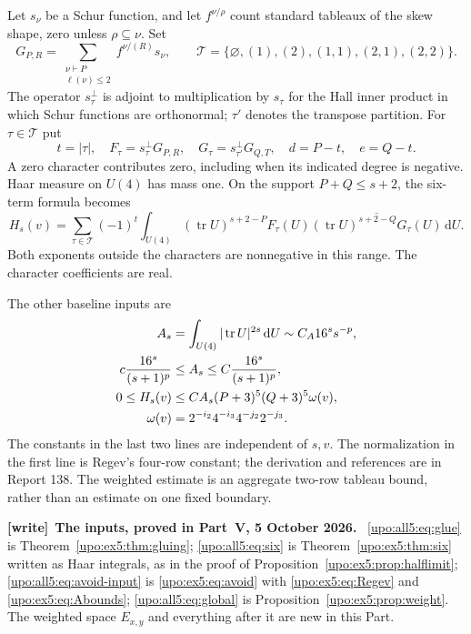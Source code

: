 \documentclass[11pt,letterpaper]{article}
\theoremstyle{remark}\newtheorem{remark}[theorem]{Remark}
\numberwithin{equation}{section}
\newcommand{\tr}{\operatorname{tr}}
\newcommand{\dd}{\,\mathrm d}
\newcommand{\Tset}{\mathcal T}
\newenvironment{writenote}[1][]{\par\smallskip\begingroup\small
 \noindent\textbf{[write]}\if\relax\detokenize{#1}\relax\else~\textbf{#1.}\fi\ }%
 {\par\endgroup\smallskip}
\begin{document}
Let $s_\nu$ be a Schur function, and let $f^{\nu/\rho}$ count
standard tableaux of the skew shape, zero unless $\rho\subseteq\nu$.
Set
\begin{equation}\label{upo:all5:eq:G}
 G_{P,R}=\sum_{\substack{\nu\vdash P\\\ell(\nu)\le2}}
          f^{\nu/(R)}s_\nu,\qquad
 \Tset=\{\varnothing,(1),(2),(1,1),(2,1),(2,2)\}.
\end{equation}
The operator $s_\tau^\perp$ is adjoint to multiplication by
$s_\tau$ for the Hall inner product in which Schur functions are
orthonormal; $\tau'$ denotes the transpose partition. For
$\tau\in\Tset$ put
\begin{equation}\label{upo:all5:eq:FG}
 t=|\tau|,\quad F_\tau=s_\tau^\perp G_{P,R},\quad
 G_\tau=s_{\tau'}^\perp G_{Q,T},\quad d=P-t,\quad e=Q-t.
\end{equation}
A zero character contributes zero, including when its indicated
degree is negative. Haar measure on $U(4)$ has mass one. On the
support $P+Q\le s+2$, the six-term formula becomes
\begin{equation}\label{upo:all5:eq:six}
 H_s(v)=\sum_{\tau\in\Tset}(-1)^t
 \int_{U(4)}(\tr U)^{s+2-P}F_\tau(U)
       \overline{(\tr U)^{s+2-Q}G_\tau(U)}\dd U.
\end{equation}
Both exponents outside the characters are nonnegative in this range.
The character coefficients are real.

The other baseline inputs are
\begin{align}\label{upo:all5:eq:avoid-input}
 A_s&=\int_{U(4)}|\tr U|^{2s}\dd U
       \sim C_A16^ss^{-p},\\
 c\frac{16^s}{(s+1)^p}&\le A_s\le C\frac{16^s}{(s+1)^p},\notag\\
 0\le H_s(v)&\le C A_s(P+3)^5(Q+3)^5\omega(v),\label{upo:all5:eq:global}\\
 \omega(v)&=2^{-i_2}4^{-i_3}4^{-j_2}2^{-j_3}.\notag
\end{align}
The constants in the last two lines are independent of $s,v$.
The normalization in the first line is Regev's four-row constant;
the derivation and references are in Report 138. The weighted estimate
is an aggregate two-row tableau bound, rather than an estimate on
one fixed boundary.
\begin{writenote}[The inputs, proved in Part~V, 5 October 2026]
\eqref{upo:all5:eq:glue} is Theorem~\ref{upo:ex5:thm:gluing}; \eqref{upo:all5:eq:six} is Theorem~\ref{upo:ex5:thm:six} written as Haar integrals, as in the proof of Proposition~\ref{upo:ex5:prop:halflimit}; \eqref{upo:all5:eq:avoid-input} is \eqref{upo:ex5:eq:avoid} with \eqref{upo:ex5:eq:Regev} and \eqref{upo:ex5:eq:Abounds}; \eqref{upo:all5:eq:global} is Proposition~\ref{upo:ex5:prop:weight}. The weighted space $E_{x,y}$ and everything after it are new in this Part.
\end{writenote}
\end{document}
